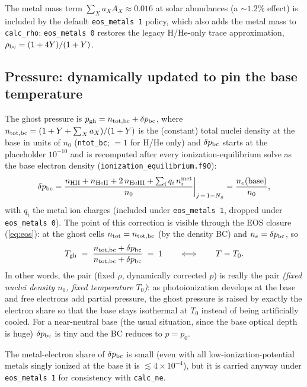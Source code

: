 \documentclass[english,a4paper]{kiseon_memo}
\begin{document}
The metal mass term $\sum_X a_X A_X \approx 0.016$ at solar abundances
(a ${\sim}1.2\%$ effect) is included by the default
\texttt{eos\_metals 1} policy, which also adds the metal mass to
\texttt{calc\_rho}; \texttt{eos\_metals 0} restores the legacy
H/He-only trace approximation, $\rho_{\rm bc} = (1+4Y)/(1+Y)$.

\subsection{Pressure: dynamically updated to pin the base temperature}
\label{sec:dpbc}

The ghost pressure is $p_{\rm gh} = n_{\rm tot,bc} + \delta p_{\rm bc}$,
where $n_{\rm tot,bc} = (1 + Y + \sum_X a_X)/(1+Y)$ is the (constant)
total nuclei density at the base in units of $n_0$
(\texttt{ntot\_bc}; $=1$ for H/He only) and $\delta p_{\rm bc}$ starts
at the placeholder $10^{-10}$ and is recomputed after every
ionization-equilibrium solve as the base electron density
(\texttt{ionization\_equilibrium.f90}):
\begin{equation}
\delta p_{\rm bc}
   = \frac{n_{\rm HII} + n_{\rm HeII} + 2\,n_{\rm HeIII}
           + \sum_i q_i\, n_i^{\rm met}}{n_0}
     \bigg|_{j\,=\,1-N_g}
   = \frac{n_e(\mbox{base})}{n_0},
\end{equation}
with $q_i$ the metal ion charges (included under
\texttt{eos\_metals 1}, dropped under \texttt{eos\_metals 0}).
The point of this correction is visible through the EOS closure
(\ref{eq:eos}): at the ghost cells $n_{\rm tot} = n_{\rm tot,bc}$ (by
the density BC) and $n_e = \delta p_{\rm bc}$, so
\begin{equation}
T_{\rm gh} \;=\; \frac{n_{\rm tot,bc} + \delta p_{\rm bc}}
                      {n_{\rm tot,bc} + \delta p_{\rm bc}}
          \;=\; 1
  \qquad\Longleftrightarrow\qquad T = T_0 .
\end{equation}
In other words, the pair (fixed $\rho$, dynamically corrected $p$)
is really the pair \emph{(fixed nuclei density $n_0$, fixed
temperature $T_0$)}: as photoionization develops at the base and free
electrons add partial pressure, the ghost pressure is raised by
exactly the electron share so that the base stays isothermal at
$T_0$ instead of being artificially cooled. For a near-neutral base
(the usual situation, since the base optical depth is huge)
$\delta p_{\rm bc}$ is tiny and the BC reduces to $p = p_0$.

The metal-electron share of $\delta p_{\rm bc}$ is small (even with
all low-ionization-potential metals singly ionized at the base it is
${\lesssim}4\times10^{-4}$), but it is carried anyway under
\texttt{eos\_metals 1} for consistency with \texttt{calc\_ne}.
\end{document}
